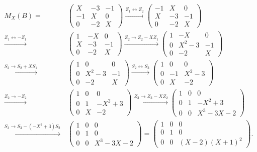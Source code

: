 \begin{align*}
    M_X(B)
  =&\,
    \begin{pmatrix}
       X & -3 & -1  \\
      -1 &  X &  0  \\
       0 & -2 &  X
    \end{pmatrix}
  \xrightarrow{Z_1 \leftrightarrow Z_2}
    \begin{pmatrix}
      -1 &  X &  0  \\
       X & -3 & -1  \\
       0 & -2 &  X
    \end{pmatrix}
  \\
  \xrightarrow{Z_1 \leftrightarrow -Z_1}&\,
    \begin{pmatrix}
      1 &  -X &  0  \\
      X &  -3 & -1  \\
      0 &  -2 &  X
    \end{pmatrix}
  \xrightarrow{Z_2 \to Z_2 - X Z_1}
    \begin{pmatrix}
      1 &    -X &  0  \\
      0 & X^2-3 & -1  \\
      0 &    -2 &  X
    \end{pmatrix}
  \\
  \xrightarrow{S_2 \to S_2 + X S_1}&\,
    \begin{pmatrix}
      1 &     0 &  0  \\
      0 & X^2-3 & -1  \\
      0 &    -2 &  X
    \end{pmatrix}
  \xrightarrow{S_2 \leftrightarrow S_3}
    \begin{pmatrix}
      1 &  0  &     0 \\
      0 & -1  & X^2-3 \\
      0 &  X  &    -2
    \end{pmatrix}
  \\
  \xrightarrow{Z_2 \to -Z_2}&\,
    \begin{pmatrix}
      1 & 0 &      0  \\
      0 & 1 & -X^2+3  \\
      0 & X &     -2
    \end{pmatrix}
  \xrightarrow{Z_3 \to Z_3 - X Z_2}
    \begin{pmatrix}
      1 & 0 &        0  \\
      0 & 1 &   -X^2+3  \\
      0 & 0 & X^3-3X-2
    \end{pmatrix}
  \\
  \xrightarrow{S_3 \to S_3 - (-X^2+3) S_2}&\,
    \begin{pmatrix}
      1 & 0 &        0  \\
      0 & 1 &        0  \\
      0 & 0 & X^3-3X-2
    \end{pmatrix}
  =
    \begin{pmatrix}
      1 & 0 &            0  \\
      0 & 1 &            0  \\
      0 & 0 & (X-2)(X+1)^2
    \end{pmatrix}.
\end{align*}
